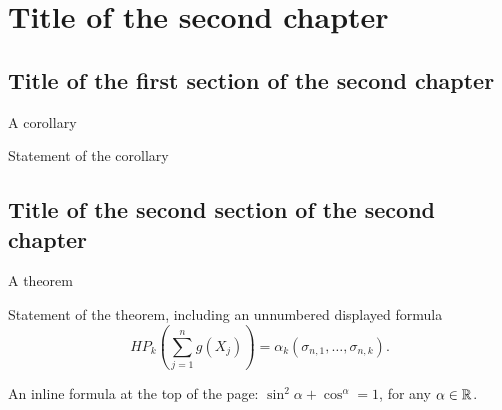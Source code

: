 \chapter{Title of the second chapter}
\label{chap:2}
\section{Title of the first section of the second chapter}
\label{sec:21}

A corollary

\begin{cor}
\label{cor:2}
    Statement of the corollary
    
    \end{cor}

    
\section{Title of the second section of the second chapter}
\label{sec:22}

A theorem 
\begin{thm}
    Statement of the theorem, including an unnumbered displayed formula
    \begin{displaymath}
        HP_k\left(\sum_{j=1}^n g(X_j)\right)= \alpha_k(\sigma_{n,1}, \dots, \sigma_{n,k}).
    \end{displaymath}
\end{thm}

\newpage

An inline formula at the top of the page: $\sin^2 \alpha+\cos^\alpha=1$, for any $\alpha\in\mathbb{R}$.
    
